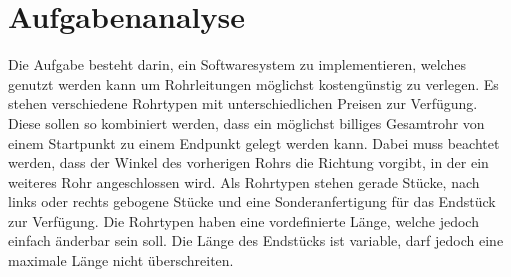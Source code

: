 \chapter{Aufgabenanalyse}
\label{Aufgabenanalyse}

Die Aufgabe besteht darin, ein Softwaresystem zu implementieren, welches genutzt werden kann um Rohrleitungen möglichst kostengünstig zu verlegen. Es stehen verschiedene Rohrtypen mit unterschiedlichen Preisen zur Verfügung. Diese sollen so kombiniert werden, dass ein möglichst billiges Gesamtrohr von einem Startpunkt zu einem Endpunkt gelegt werden kann. Dabei muss beachtet werden, dass der Winkel des vorherigen Rohrs die Richtung vorgibt, in der ein weiteres Rohr angeschlossen wird. Als Rohrtypen stehen gerade Stücke, nach links oder rechts gebogene Stücke und eine Sonderanfertigung für das Endstück zur Verfügung. Die Rohrtypen haben eine vordefinierte Länge, welche jedoch einfach änderbar sein soll. Die Länge des Endstücks ist variable, darf jedoch eine maximale Länge nicht überschreiten.


















































